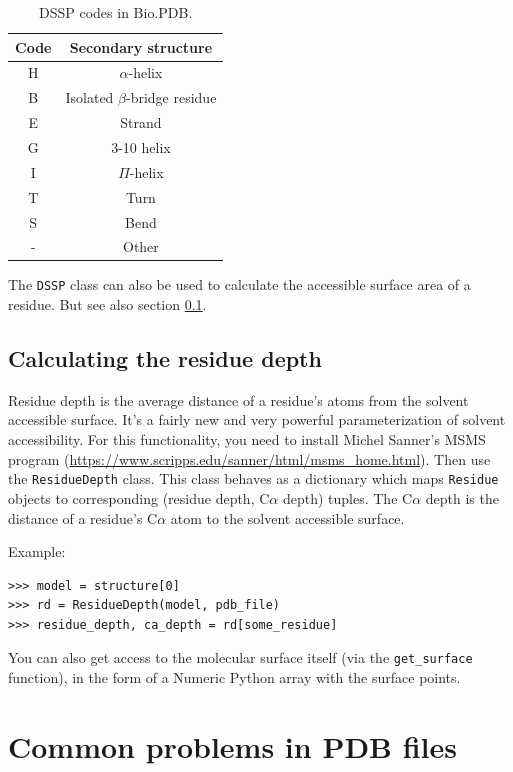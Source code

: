 \begin{table}
\begin{tabular}{|c|c|}
\hline
Code&
Secondary structure \\
\hline
\hline
H&
$\alpha$-helix \\
\hline
B&
Isolated $\beta$-bridge residue \\
\hline
E&
Strand \\
\hline
G&
3-10 helix \\
\hline
I&
$\Pi$-helix \\
\hline
T&
Turn\\
\hline
S&
Bend \\
\hline
-&
Other\\
\hline
\end{tabular}
\caption{DSSP codes in Bio.PDB.}
\label{table:DSSP-codes}
\end{table}

The \texttt{DSSP} class can also be used to calculate the accessible surface area of a residue. But see also section \ref{sec:residue_depth}.

\subsection{Calculating the residue depth}
\label{sec:residue_depth}

Residue depth is the average distance of a residue's atoms from the
solvent accessible surface. It's a fairly new and very powerful parameterization
of solvent accessibility. For this functionality, you need to install
Michel Sanner's MSMS program (\url{https://www.scripps.edu/sanner/html/msms_home.html}).
Then use the \texttt{ResidueDepth} class. This class behaves as a
dictionary which maps \texttt{Residue} objects to corresponding (residue
depth, C$\alpha$ depth) tuples. The C$\alpha$ depth is the distance
of a residue's C$\alpha$ atom to the solvent accessible surface.

Example:

\begin{verbatim}
>>> model = structure[0]
>>> rd = ResidueDepth(model, pdb_file)
>>> residue_depth, ca_depth = rd[some_residue]
\end{verbatim}
You can also get access to the molecular surface itself (via the \texttt{get\_surface}
function), in the form of a Numeric Python array with the surface points.

\section{Common problems in PDB files}

